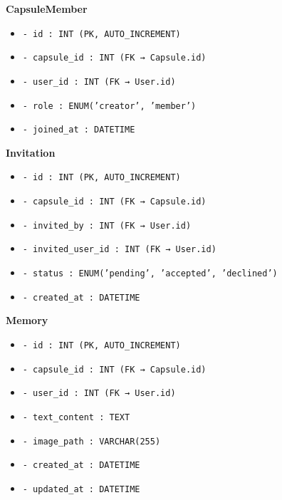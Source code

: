 \documentclass[12pt,a4paper]{report}
\begin{document}
\begin{figure}[H]
\begin{tcolorbox}[colback=codebg, colframe=codeframe, width=\textwidth, title={\textbf{Diagramme de classes — ChronoVault}}]
        \vspace{0.4cm}
        \textbf{CapsuleMember}
        \begin{itemize}[noitemsep, leftmargin=1.5em]
            \item \texttt{- id : INT (PK, AUTO\_INCREMENT)}
            \item \texttt{- capsule\_id : INT (FK → Capsule.id)}
            \item \texttt{- user\_id : INT (FK → User.id)}
            \item \texttt{- role : ENUM('creator', 'member')}
            \item \texttt{- joined\_at : DATETIME}
        \end{itemize}

        \vspace{0.4cm}
        \textbf{Invitation}
        \begin{itemize}[noitemsep, leftmargin=1.5em]
            \item \texttt{- id : INT (PK, AUTO\_INCREMENT)}
            \item \texttt{- capsule\_id : INT (FK → Capsule.id)}
            \item \texttt{- invited\_by : INT (FK → User.id)}
            \item \texttt{- invited\_user\_id : INT (FK → User.id)}
            \item \texttt{- status : ENUM('pending', 'accepted', 'declined')}
            \item \texttt{- created\_at : DATETIME}
        \end{itemize}

        \vspace{0.4cm}
        \textbf{Memory}
        \begin{itemize}[noitemsep, leftmargin=1.5em]
            \item \texttt{- id : INT (PK, AUTO\_INCREMENT)}
            \item \texttt{- capsule\_id : INT (FK → Capsule.id)}
            \item \texttt{- user\_id : INT (FK → User.id)}
            \item \texttt{- text\_content : TEXT}
            \item \texttt{- image\_path : VARCHAR(255)}
            \item \texttt{- created\_at : DATETIME}
            \item \texttt{- updated\_at : DATETIME}
        \end{itemize}


\end{tcolorbox}
\end{figure}
\end{document}
